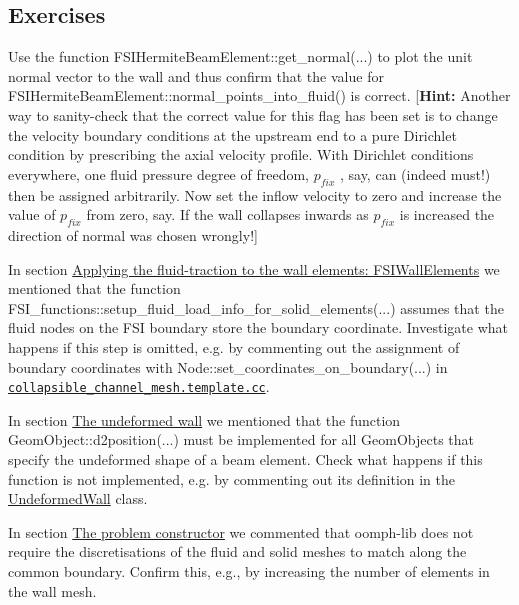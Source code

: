  

\hypertarget{index_ex}{}\subsection{Exercises}\label{index_ex}

\begin{DoxyEnumerate}
\item Use the function {\ttfamily F\+S\+I\+Hermite\+Beam\+Element\+::get\+\_\+normal}(...) to plot the unit normal vector to the wall and thus confirm that the value for {\ttfamily F\+S\+I\+Hermite\+Beam\+Element\+::normal\+\_\+points\+\_\+into\+\_\+fluid()} is correct. \mbox{[}{\bfseries Hint\+:} Another way to sanity-\/check that the correct value for this flag has been set is to change the velocity boundary conditions at the upstream end to a pure Dirichlet condition by prescribing the axial velocity profile. With Dirichlet conditions everywhere, one fluid pressure degree of freedom, $ p_{fix} $ , say, can (indeed must!) then be assigned arbitrarily. Now set the inflow velocity to zero and increase the value of $ p_{fix} $ from zero, say. If the wall collapses inwards as $ p_{fix} $ is increased the direction of normal was chosen wrongly!\mbox{]}
\item In section \hyperlink{index_fsi_wall_elements}{Applying the fluid-\/traction to the wall elements\+: F\+S\+I\+Wall\+Elements} we mentioned that the function {\ttfamily F\+S\+I\+\_\+functions\+::setup\+\_\+fluid\+\_\+load\+\_\+info\+\_\+for\+\_\+solid\+\_\+elements}(...) assumes that the fluid nodes on the F\+SI boundary store the boundary coordinate. Investigate what happens if this step is omitted, e.\+g. by commenting out the assignment of boundary coordinates with {\ttfamily Node\+::set\+\_\+coordinates\+\_\+on\+\_\+boundary}(...) in \href{../../../../src/meshes/collapsible_channel_mesh.template.cc}{\tt collapsible\+\_\+channel\+\_\+mesh.\+template.\+cc}.
\item In section \hyperlink{index_undeformed}{The undeformed wall} we mentioned that the function {\ttfamily Geom\+Object\+::d2position}(...) must be implemented for all {\ttfamily Geom\+Objects} that specify the undeformed shape of a beam element. Check what happens if this function is not implemented, e.\+g. by commenting out its definition in the {\ttfamily \hyperlink{classUndeformedWall}{Undeformed\+Wall}} class.
\item In section \hyperlink{index_problemcontr}{The problem constructor} we commented that {\ttfamily oomph-\/lib} does not require the discretisations of the fluid and solid meshes to match along the common boundary. Confirm this, e.\+g., by increasing the number of elements in the wall mesh.
\end{DoxyEnumerate}



